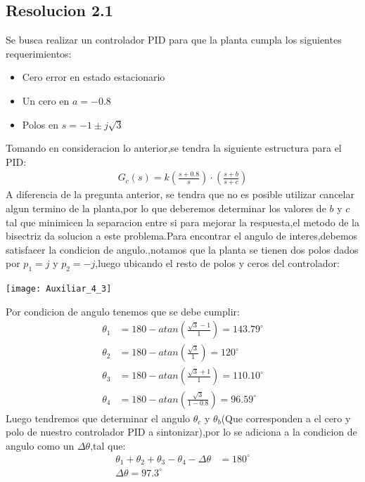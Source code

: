\documentclass[
  11pt,
  letterpaper,
   addpoints,
   answers
  ]{exam}
\begin{document}
\begin{questions}
\begin{solution}
\subsection*{Resolucion 2.1}
Se busca realizar un controlador PID para que la planta cumpla los siguientes requerimientos:
\begin{itemize}
    \item Cero error en estado estacionario
    \item Un cero en $a=-0.8$
    \item Polos en $s=-1\pm j\sqrt{3}$
\end{itemize}
Tomando en consideracion lo anterior,se tendra la siguiente estructura para el PID:
\begin{align}
    G_{c}(s) = k \left(\frac{s+0.8}{s}\right)\cdot \left(\frac{s+b}{s+c}\right)
\end{align}
A diferencia de la pregunta anterior, se tendra que no es posible utilizar cancelar algun termino de la planta,por lo que deberemos determinar los valores de $b$ y $c$ tal que minimicen la separacion entre si para mejorar la respuesta,el metodo de la bisectriz da solucion a este problema.Para encontrar el angulo de interes,debemos satisfacer la condicion de angulo.,notamos que la planta se tienen dos polos dados por $p_{1}=j$ y $p_{2}=-j$,luego ubicando el resto de polos y ceros del controlador:
\begin{center}
    \texttt{[image: Auxiliar\_4\_3]}
\end{center}
Por condicion de angulo tenemos que se debe cumplir:
\begin{align}
    \theta_{1} &= 180 - atan\left(\frac{\sqrt{3}-1}{1}\right) = 143.79^{\circ} \\
    \theta_{2} &= 180 - atan\left(\frac{\sqrt{3}}{1}\right) = 120^{\circ} \\
    \theta_{3} &= 180 - atan\left(\frac{\sqrt{3}+1}{1}\right) = 110.10^{\circ} \\
    \theta_{4} &= 180 - atan\left(\frac{\sqrt{3}}{1-0.8}\right) = 96.59^{\circ}
\end{align}
Luego tendremos que determinar el angulo $\theta_{c}$ y $\theta_{b}$(Que corresponden a el cero y polo de nuestro controlador PID a sintonizar),por lo se adiciona a la condicion de angulo como un $\Delta\theta$,tal que:
\begin{align}
    \theta_{1} + \theta_{2} + \theta_{3} - \theta_{4} -\Delta\theta &= 180^{\circ}\\
    \Delta\theta = 97.3^{\circ}

\end{align}
\end{solution}
\end{questions}
\end{document}
